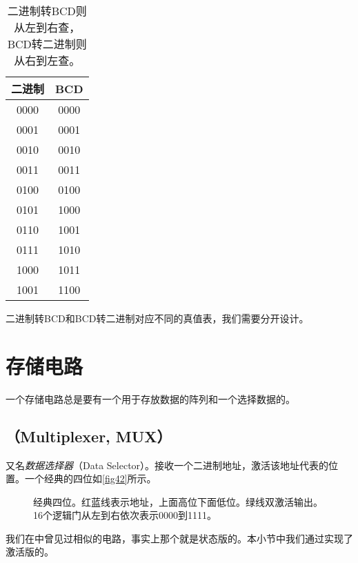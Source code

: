 \begin{table}[!ht]
\centering
\begin{tabular}{|c|c|}
\hline
二进制&BCD\\\hline
0000&0000\\\hline
0001&0001\\\hline
0010&0010\\\hline
0011&0011\\\hline
0100&0100\\\hline
0101&1000\\\hline
0110&1001\\\hline
0111&1010\\\hline
1000&1011\\\hline
1001&1100\\\hline
\end{tabular}
\caption{二进制转BCD则从左到右查，BCD转二进制则从右到左查。}\label{tab12}
\end{table}

二进制转BCD和BCD转二进制对应不同的真值表，我们需要分开设计。

\section{存储电路}
一个存储电路总是要有一个用于存放数据的阵列和一个选择数据的\termMUX 。

\subsection{\termMUX （Multiplexer, MUX）}
\emph{\termMUX}又名\emph{数据选择器}（Data Selector）。\termMUX 接收一个二进制地址，激活该地址代表的位置。一个经典的四位\termMUX 如\autoref{fig42}所示。

\begin{figure}[!ht]
\centering
{}%
%
\caption{经典四位\termMUX。红蓝线表示地址，上面高位下面低位。绿线双激活输出。16个逻辑门从左到右依次表示0000到1111。}\label{fig42}
\end{figure}

我们在中曾见过相似的电路，事实上那个就是状态版的\termMUX 。本小节中我们通过实现了激活版的\termMUX 。

